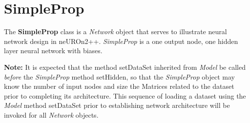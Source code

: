 \documentclass{report}
\begin{document}
\section{SimpleProp}

The {\bf SimpleProp} class is a {\em Network} object that serves to
illustrate neural network design in neUROn2++.  {\em SimpleProp} is a
one output node, one hidden layer neural network with biases.

{\bf Note:} It is expected that the method setDataSet inherited from
{\em Model} be called {\em before} the {\em SimpleProp} method
setHidden, so that the {\em SimpleProp} object may know the number of
input nodes and size the Matrices related to the dataset prior to
completing its architecture.  This sequence of loading a dataset using
the {\em Model} method setDataSet prior to establishing network
architecture will be invoked for all {\em Network} objects.
\end{document}
